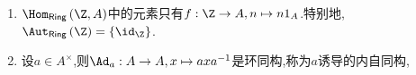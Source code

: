 \begin{example}{}{}
	\begin{enumerate}
		\item $\Hom_{\mathsf{Ring}}\left(\Z,A\right)$中的元素只有$f:\Z\to A,n\mapsto n1_{A}$.特别地,$\Aut_{\mathsf{Ring}}\left(\Z\right)=\left\{\id_{\Z}\right\}$.
		\item 设$a\in A^{\times}$,则$\Ad_{a}:A\to A,x\mapsto axa^{-1}$是环同构,称为$a$诱导的内自同构,
	\end{enumerate}
\end{example}
































































































